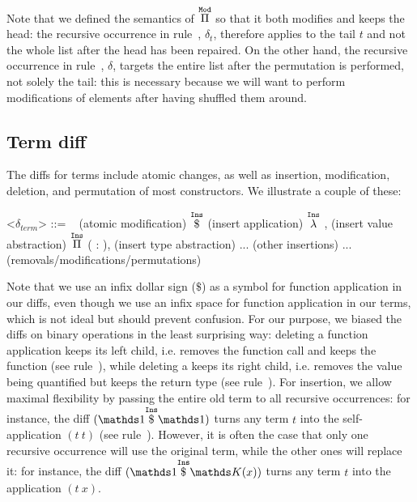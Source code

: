 Note that we defined the semantics of $\overset{\mathtt{Mod}}{\Pi}$ so that it both modifies
and keeps the head: the recursive occurrence in rule~,
$\delta_t$, therefore applies to the tail $t$ and not the whole list after the
head has been repaired.  On the other hand, the recursive occurrence in
rule~, $\delta$, targets the entire list after the permutation
is performed, not solely the tail: this is necessary because we will want to
perform modifications of elements after having shuffled them around.

\subsection{Term diff}\label{chick-diffs-term-diff}

The diffs for terms include atomic changes, as well as insertion, modification,
deletion, and permutation of most constructors.  We illustrate a couple of
these:

\begin{grammar}
<$\delta_{term}$> ::= \ %
\alt {} \hfill (atomic modification)
\alt {} $\overset{\mathtt{Ins}}{ \$ }$  \hfill
(insert application)
\alt $\overset{\mathtt{Ins}}{\lambda}$ ,  \hfill (insert value
abstraction)
\alt $\overset{\mathtt{Ins}}{\Pi}$ ( : ),
 \hfill (insert type abstraction)
\alt ... \hfill (other insertions)
\alt ... \hfill (removals/modifications/permutations)
\end{grammar}

\noindent Note that we use an infix dollar sign ($\$$) as a symbol for function
application in our diffs, even though we use an infix space for function
application in our terms, which is not ideal but should prevent confusion.  For
our purpose, we biased the diffs on binary operations in the least surprising
way: deleting a function application keeps its left child, i.e. removes the
function call and keeps the function (see rule~), while
deleting a  keeps its right child, i.e. removes the value being
quantified but keeps the return type (see rule~).  For
insertion, we allow maximal flexibility by passing the entire old term to all
recursive occurrences: for instance, the diff
$(\MathInsApp{\MathSame}{\MathSame})$ turns any term $t$ into the
self-application $(t\ t)$ (see rule~).  However, it is often
the case that only one recursive occurrence will use the original term, while
the other ones will replace it: for instance, the diff
$(\MathInsApp{\MathSame}{\MathReplace{x}})$ turns any term $t$ into the
application $(t\ x)$.

